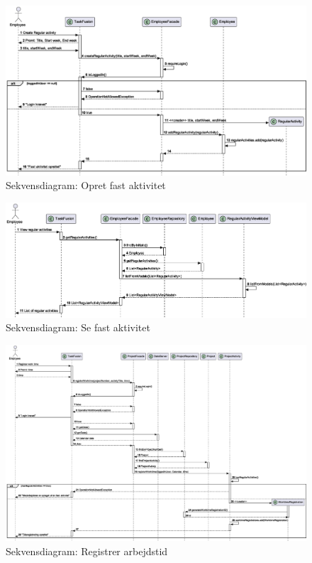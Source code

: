 \begin{figure}[H]
    \centering
    \caption{Sekvensdiagram: Opret fast aktivitet}\label{fig:sequenceCreateRegularActivity}
    \includegraphics[width=\textwidth]{RequirementsAndDesign/SequenceDiagrams/seqCreateRegularActivity.eps}
\end{figure}
\begin{figure}[H]
    \centering
    \caption{Sekvensdiagram: Se fast aktivitet}\label{fig:sequenceViewRegularActivity}
    \includegraphics[width=\textwidth]{RequirementsAndDesign/SequenceDiagrams/seqViewRegularActivity.eps}
\end{figure}
\begin{figure}[H]
    \centering
    \caption{Sekvensdiagram: Registrer arbejdstid}\label{fig:sequenceRegisterWorktime}
    \includegraphics[width=\textwidth]{RequirementsAndDesign/SequenceDiagrams/seqRegisterWorktime.eps}
\end{figure}
